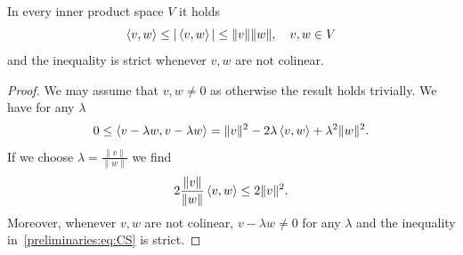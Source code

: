 \begin{cor}
    In every inner product space $V$ it holds
    \begin{equation}
        \left\langle v , w\right\rangle\leq |\left\langle v , w\right\rangle| \leq \|v\|\|w\|,\quad v,w\in V
    \end{equation}
    and the inequality is strict whenever $v,w$ are not colinear.
\end{cor}
\begin{proof}
    We may assume that $v,w\neq 0$ as otherwise the result holds trivially. We have for any $\lambda$
    \begin{equation}\label{preliminaries:eq:CS}
        0\leq \left\langle v-\lambda w , v-\lambda w\right\rangle = \|v\|^2 -2\lambda \left\langle v , w\right\rangle + \lambda^2\|w\|^2.
    \end{equation}
    If we choose $\lambda = \frac{\|v\|}{\|w\|}$ we find
    \begin{equation}
        2\frac{\|v\|}{\|w\|} \left\langle v , w\right\rangle\leq 2\|v\|^2.
    \end{equation}
    Moreover, whenever $v,w$ are not colinear, $v-\lambda w\neq 0$ for any $\lambda$ and the inequality in~\eqref{preliminaries:eq:CS} is strict.
\end{proof}

